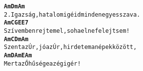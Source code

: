 \begin{minipage}{\textwidth}
\kottastart
{}
\kottaend
\begin{minipage}{\textwidth}
\begin{alltt}
\textbf{        Am             Dm                Am}
2. Igazság, hatalom igéid minden egyes szava.
\textbf{          Am        C        G            E  E7}
   Szívemben rejtem el, soha el ne felejtsem!
\textbf{            Am        C           Dm         Am}
   Szent az Úr, jó az Úr, hirdetem  a népek között,
\textbf{           Am     D            Am E Am}
   Mert az Ő hűsége az égig ér!
\end{alltt}
\vspace{0.0cm}
\versszakspacing
\end{minipage}
\end{minipage}
~\vspace{1.0cm}
\newline
